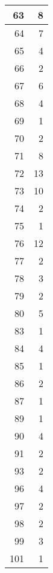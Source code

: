 \begin{tabular}{|r|r|}
\hline
63&8\\
\hline
64&7\\
\hline
65&4\\
\hline
66&2\\
\hline
67&6\\
\hline
68&4\\
\hline
69&1\\
\hline
70&2\\
\hline
71&8\\
\hline
72&13\\
\hline
73&10\\
\hline
74&2\\
\hline
75&1\\
\hline
76&12\\
\hline
77&2\\
\hline
78&3\\
\hline
79&2\\
\hline
80&5\\
\hline
83&1\\
\hline
84&4\\
\hline
85&1\\
\hline
86&2\\
\hline
87&1\\
\hline
89&1\\
\hline
90&4\\
\hline
91&2\\
\hline
93&2\\
\hline
96&4\\
\hline
97&2\\
\hline
98&2\\
\hline
99&3\\
\hline
101&1\\
\hline
\end{tabular}

